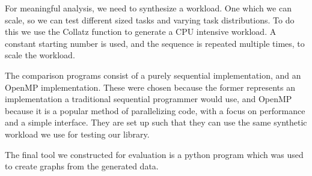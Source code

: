 For meaningful analysis, we need to synthesize a workload. One which we can scale, so we can test different sized tasks and varying task distributions. To do this we use the Collatz function to generate a CPU intensive workload. A constant starting number is used, and the sequence is repeated multiple times, to scale the workload.

The comparison programs consist of a purely sequential implementation, and an OpenMP implementation. These were chosen because the former represents an implementation a traditional sequential programmer would use, and OpenMP because it is a popular method of parallelizing code, with a focus on performance and a simple interface. They are set up such that they can use the same synthetic workload we use for testing our library.

The final tool we constructed for evaluation is a python program which was used to create graphs from the generated data.